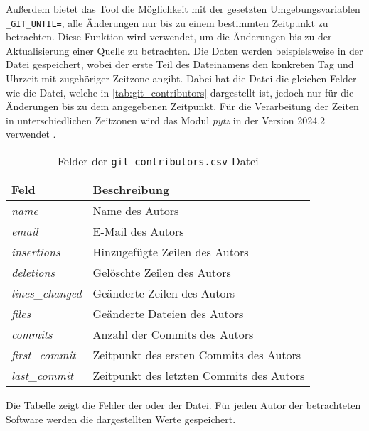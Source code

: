 Außerdem bietet das Tool die Möglichkeit mit der gesetzten Umgebungsvariablen \texttt{\_GIT\_UNTIL=}, alle Änderungen nur bis zu einem bestimmten Zeitpunkt zu betrachten.
Diese Funktion wird verwendet, um die Änderungen bis zu der Aktualisierung einer Quelle zu betrachten.
Die Daten werden beispielsweise in der Datei  gespeichert, wobei der erste Teil des Dateinamens den konkreten Tag und Uhrzeit mit zugehöriger Zeitzone angibt.
Dabei hat die Datei die gleichen Felder wie die  Datei, welche in \autoref{tab:git_contributors} dargestellt ist, jedoch nur für die Änderungen bis zu dem angegebenen Zeitpunkt.
Für die Verarbeitung der Zeiten in unterschiedlichen Zeitzonen wird das Modul \emph{pytz} in der Version 2024.2 verwendet \autocite{bishop_stub42pytz_2024}.

\begin{table}
    \centering
    \begin{tabularx}{\textwidth}{XL{10.2cm}}
        \toprule
        \textbf{Feld}         & \textbf{Beschreibung}                   \\ \midrule
        \emph{name}           & Name des Autors                         \\
        \emph{email}          & E-Mail des Autors                       \\
        \emph{insertions}     & Hinzugefügte Zeilen des Autors          \\
        \emph{deletions}      & Gelöschte Zeilen des Autors             \\
        \emph{lines\_changed} & Geänderte Zeilen des Autors             \\
        \emph{files}          & Geänderte Dateien des Autors            \\
        \emph{commits}        & Anzahl der Commits des Autors           \\
        \emph{first\_commit}  & Zeitpunkt des ersten Commits des Autors \\
        \emph{last\_commit}  & Zeitpunkt des letzten Commits des Autors \\
        \bottomrule
    \end{tabularx}
    \caption{Felder der \texttt{git\_contributors.csv} Datei}
    \label{tab:git_contributors}
    \small
    \raggedright
    Die Tabelle zeigt die Felder der  oder der  Datei. Für jeden Autor der betrachteten Software werden die dargestellten Werte gespeichert.
\end{table}
